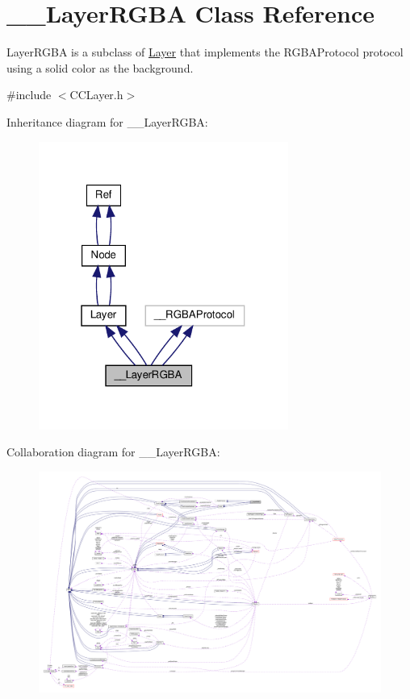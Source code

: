 \hypertarget{class____LayerRGBA}{}\section{\+\_\+\+\_\+\+Layer\+R\+G\+BA Class Reference}
\label{class____LayerRGBA}


Layer\+R\+G\+BA is a subclass of \hyperlink{classLayer}{Layer} that implements the R\+G\+B\+A\+Protocol protocol using a solid color as the background.  




{\ttfamily \#include $<$C\+C\+Layer.\+h$>$}



Inheritance diagram for \+\_\+\+\_\+\+Layer\+R\+G\+BA\+:
\nopagebreak
\begin{figure}[H]
\begin{center}
\leavevmode
\includegraphics[width=232pt]{class____LayerRGBA__inherit__graph}
\end{center}
\end{figure}


Collaboration diagram for \+\_\+\+\_\+\+Layer\+R\+G\+BA\+:
\nopagebreak
\begin{figure}[H]
\begin{center}
\leavevmode
\includegraphics[width=350pt]{class____LayerRGBA__coll__graph}
\end{center}
\end{figure}
